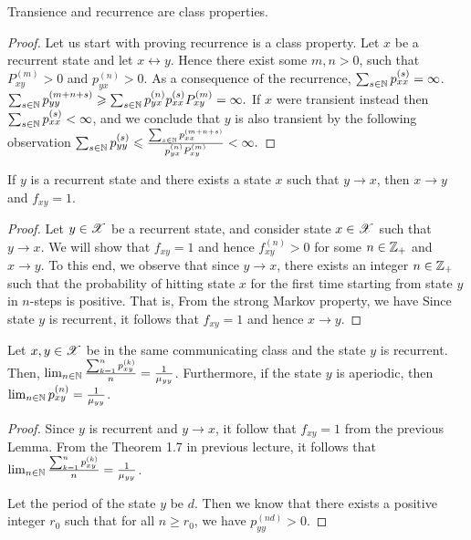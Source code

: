 \documentclass[letterpaper,10pt,english]{article}
\begin{document}
\begin{prop}
Transience and recurrence are class properties.
\end{prop}
\begin{proof}
Let us start with proving recurrence is a class property. 
Let $x$ be a recurrent state and let $x \leftrightarrow y$. 
Hence there exist some $m,n >0$, such that $P_{xy}^{(m)} > 0$ and $p_{yx}^{(n)}>0$. 
As a consequence of the recurrence, $\sum_{s \in \mathbb{N}} p_{xx}^{(s)} = \infty$. 
$
\sum_{s \in \mathbb{N}} p_{yy}^{(m+n+s)} \geqslant \sum_{s \in \mathbb{N}} p_{yx}^{(n)} p_{xx}^{(s)} P_{xy}^{(m)} = \infty.
$
If $x$ were transient instead then $\sum_{s\in\mathbb{N}}p_{xx}^{(s)}<\infty$, and we conclude that $y$ is also transient by the following observation
$
\sum_{s \in \mathbb{N}}  p_{yy}^{(s)} \leqslant \frac{\sum_{s \in \mathbb{N}} p_{xx}^{(m+n+s)} }{ p_{yx}^{(n)} P_{xy}^{(m)}}< \infty.
$
\end{proof}
\begin{cor}
If $y$ is a recurrent state and there exists a state $x$ such that $y \to x$, then $x \to y$ and $f_{xy} = 1$.
\end{cor}
\begin{proof} 
Let $y \in \mathscr{X}$ be a recurrent state, and consider state $x \in \mathscr{X}$ such that $y \to x$. 
We will show that $f_{xy} = 1$ and hence $f_{xy}^{(n)} > 0$ for some $n \in \mathbb{Z}_+$ and $x \to y$. 
To this end, we observe that since $y \to x$, 
there exists an integer $n \in \mathbb{Z}_+$ such that the probability of hitting state $x$ for the first time starting from state $y$ in $n$-steps is positive. 
That is, 
From the strong Markov property, we have 
Since state $y$ is recurrent, it follows that $f_{xy} = 1$ and hence $x \to y$. 
\end{proof}
\begin{cor} 
Let $x, y \in \mathscr{X}$ be in the same communicating class and the state $y$ is recurrent.  
Then, $\lim_{n \in \mathbb{N}}\frac{\sum_{k=1}^np_{xy}^{(k)}}{n} = \frac{1}{\mu_{yy}}$. 
Furthermore, if the state $y$ is aperiodic, then $\lim_{n \in \mathbb{N}}p_{xy}^{(n)} = \frac{1}{\mu_{yy}}$. 
\end{cor}
\begin{proof} 
Since $y$ is recurrent and $y \to x$, it follow that $f_{xy} = 1$ from the previous Lemma. 
From the Theorem 1.7 in previous lecture, it follows that $\lim_{n \in \mathbb{N}}\frac{\sum_{k=1}^np_{xy}^{(k)}}{n} = \frac{1}{\mu_{yy}}$. 

Let the period of the state $y$ be $d$. 
Then we know that there exists a positive integer $r_0$ such that for all $n \ge r_0$, we have $p_{yy}^{(nd)} > 0$. 
\end{proof}
\end{document}
